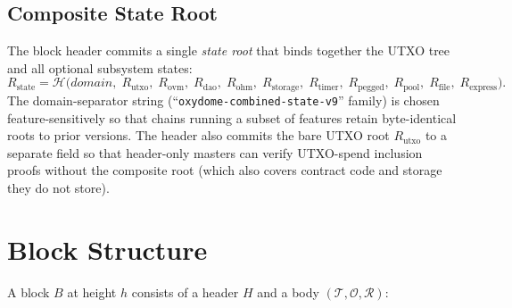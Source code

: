 \documentclass[11pt,a4paper]{article}
\theoremstyle{definition}
\newcommand{\hash}{\mathcal{H}}
\begin{document}
\subsection{Composite State Root}
\label{sec:state-root}

The block header commits a single \emph{state root} that binds together the
UTXO tree and all optional subsystem states:
\[
R_{\mathrm{state}} = \hash\bigl(
  \mathit{domain},\;
  R_{\mathrm{utxo}},\;
  R_{\mathrm{ovm}},\;
  R_{\mathrm{dao}},\;
  R_{\mathrm{ohm}},\;
  R_{\mathrm{storage}},\;
  R_{\mathrm{timer}},\;
  R_{\mathrm{pegged}},\;
  R_{\mathrm{pool}},\;
  R_{\mathrm{file}},\;
  R_{\mathrm{express}}
\bigr).
\]
The domain-separator string (``\texttt{oxydome-combined-state-v9}'' family) is
chosen feature-sensitively so that chains running a subset of features retain
byte-identical roots to prior versions.  The header also commits the bare
UTXO root $R_{\mathrm{utxo}}$ to a separate field so that header-only masters
can verify UTXO-spend inclusion proofs without the composite root (which also
covers contract code and storage they do not store).

\section{Block Structure}
\label{sec:block}

A block $B$ at height $h$ consists of a header $H$ and a body
$(\mathcal{T}, \mathcal{O}, \mathcal{R})$:
\end{document}
